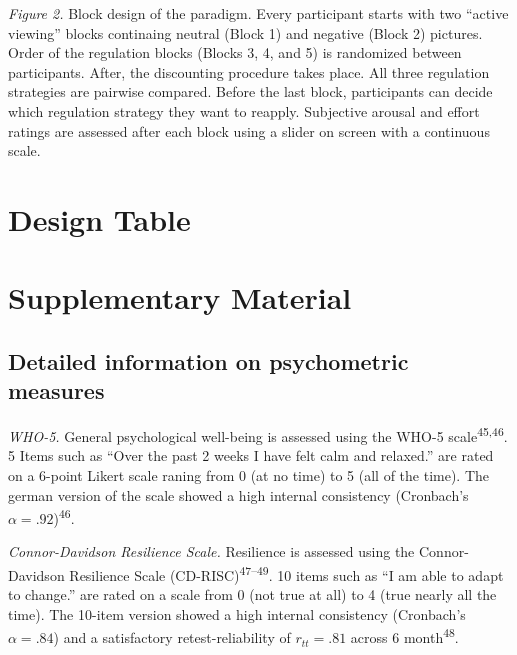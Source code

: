 \documentclass[
  english,
  man,floatsintext]{apa6}
\begin{document}
\emph{Figure 2.}
Block design of the paradigm.
Every participant starts with two ``active viewing'' blocks continaing neutral (Block 1) and negative (Block 2) pictures.
Order of the regulation blocks (Blocks 3, 4, and 5) is randomized between participants. After, the discounting procedure takes place.
All three regulation strategies are pairwise compared. Before the last block, participants can decide which regulation strategy they want to reapply.
Subjective arousal and effort ratings are assessed after each block using a slider on screen with a continuous scale.

\hypertarget{DesignTable}{%
\section{Design Table}\label{DesignTable}}



\newpage

\hypertarget{SupplementaryMaterial}{%
\section{Supplementary Material}\label{SupplementaryMaterial}}



\newpage

\hypertarget{SupplementQuestionnaires}{%
\subsection{Detailed information on psychometric measures}\label{SupplementQuestionnaires}}

\emph{WHO-5.}
General psychological well-being is assessed using the WHO-5 scale\textsuperscript{45,46}.
5 Items such as ``Over the past 2 weeks I have felt calm and relaxed.'' are rated on a 6-point Likert scale raning from 0 (at no time) to 5 (all of the time).
The german version of the scale showed a high internal consistency (Cronbach's \(\alpha=.92\))\textsuperscript{46}.

\emph{Connor-Davidson Resilience Scale.}
Resilience is assessed using the Connor-Davidson Resilience Scale (CD-RISC)\textsuperscript{47--49}.
10 items such as ``I am able to adapt to change.'' are rated on a scale from 0 (not true at all) to 4 (true nearly all the time).
The 10-item version showed a high internal consistency (Cronbach's \(\alpha=.84\)) and a satisfactory retest-reliability of \(r_{tt}=.81\) across 6 month\textsuperscript{48}.
\end{document}
